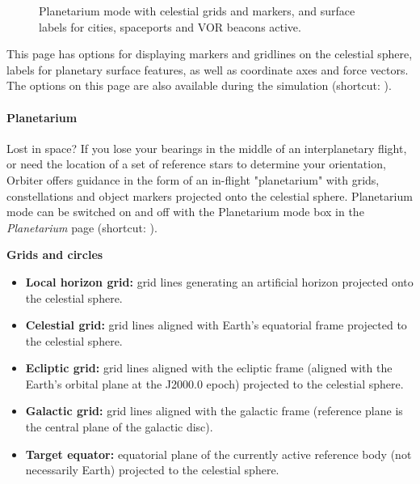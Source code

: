 \documentclass[Orbiter User Manual.tex]{subfiles}
\begin{document}
\begin{figure}[H]
	\centering
	\caption{Planetarium mode with celestial grids and markers, and surface labels for cities, spaceports and VOR beacons active.}
\end{figure}

\noindent
This page has options for displaying markers and gridlines on the celestial sphere, labels for planetary surface features, as well as coordinate axes and force vectors. The options on this page are also available during the simulation (shortcut: \Ctrl{}).

\begin{figure}[H]
	\centering
\end{figure}

\paragraph{Planetarium}
Lost in space? If you lose your bearings in the middle of an interplanetary flight, or need the location of a set of reference stars to determine your orientation, Orbiter offers guidance in the form of an in-flight "planetarium" with grids, constellations and object markers projected onto the celestial sphere. Planetarium mode can be switched on and off with the Planetarium mode box in the \textit{Planetarium} page (shortcut: ).


\begin{figure}[H]
	\centering
\end{figure}

\noindent
\textbf{Grids and circles}
\begin{itemize}
\item \textbf{Local horizon grid:} grid lines generating an artificial horizon projected onto the celestial sphere.
\item \textbf{Celestial grid:} grid lines aligned with Earth's equatorial frame projected to the celestial sphere.
\item \textbf{Ecliptic grid:} grid lines aligned with the ecliptic frame (aligned with the Earth's orbital plane at the J2000.0 epoch) projected to the celestial sphere.
\item \textbf{Galactic grid:} grid lines aligned with the galactic frame (reference plane is the central plane of the galactic disc).
\item \textbf{Target equator:} equatorial plane of the currently active reference body (not necessarily Earth) projected to the celestial sphere.
\end{itemize}
\end{document}
